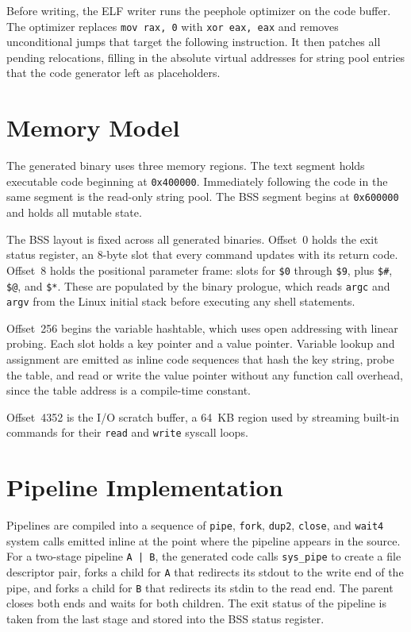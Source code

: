 \documentclass[10pt,twocolumn]{article}
\begin{document}
Before writing, the ELF writer runs the peephole optimizer on the
code buffer. The optimizer replaces \texttt{mov~rax,~0} with
\texttt{xor~eax,~eax} and removes unconditional jumps that target the
following instruction. It then patches all pending relocations,
filling in the absolute virtual addresses for string pool entries that
the code generator left as placeholders.


\section{Memory Model}

The generated binary uses three memory regions. The text segment holds
executable code beginning at \texttt{0x400000}. Immediately following
the code in the same segment is the read-only string pool. The BSS
segment begins at \texttt{0x600000} and holds all mutable state.

The BSS layout is fixed across all generated binaries. Offset~0 holds
the exit status register, an 8-byte slot that every command updates
with its return code. Offset~8 holds the positional parameter frame:
slots for \texttt{\$0} through \texttt{\$9}, plus \texttt{\$\#},
\texttt{\$@}, and \texttt{\$*}. These are populated by the binary
prologue, which reads \texttt{argc} and \texttt{argv} from the Linux
initial stack before executing any shell statements.

Offset~256 begins the variable hashtable, which uses open addressing
with linear probing. Each slot holds a key pointer and a value
pointer. Variable lookup and assignment are emitted as inline code
sequences that hash the key string, probe the table, and read or write
the value pointer without any function call overhead, since the table
address is a compile-time constant.

Offset~4352 is the I/O scratch buffer, a 64~KB region used by
streaming built-in commands for their \texttt{read} and \texttt{write}
syscall loops.


\section{Pipeline Implementation}

Pipelines are compiled into a sequence of \texttt{pipe},
\texttt{fork}, \texttt{dup2}, \texttt{close}, and \texttt{wait4}
system calls emitted inline at the point where the pipeline appears in
the source. For a two-stage pipeline \texttt{A~|~B}, the generated
code calls \texttt{sys\_pipe} to create a file descriptor pair, forks
a child for \texttt{A} that redirects its stdout to the write end of
the pipe, and forks a child for \texttt{B} that redirects its stdin to
the read end. The parent closes both ends and waits for both children.
The exit status of the pipeline is taken from the last stage and
stored into the BSS status register.
\end{document}
